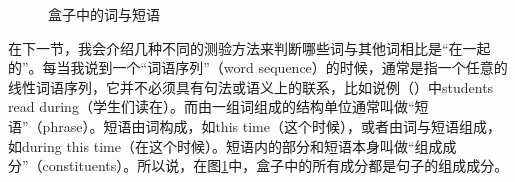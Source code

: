 \begin{figure}
\centering
{}
\caption{\label{Abbildung-Schachteln}盒子中的词与短语}
\end{figure}%

在下一节，我会介绍几种不同的测验方法来判断哪些词与其他词相比是“在一起的”。每当我说到一个“词语序列”（word sequence）的时候，通常是指一个任意的线性词语序列，它并不必须具有句法或语义上的联系，比如说例（）中students read during（学生们读在）。而由一组词组成的结构单位通常叫做“短语”（phrase）。短语由词构成，如this time（这个时候），或者由词与短语组成，如during this time（在这个时候）。短语内的部分和短语本身叫做“组成成分”（constituents）。所以说，在图\ref{Abbildung-Schachteln}中，盒子中的所有成分都是句子的组成成分。


